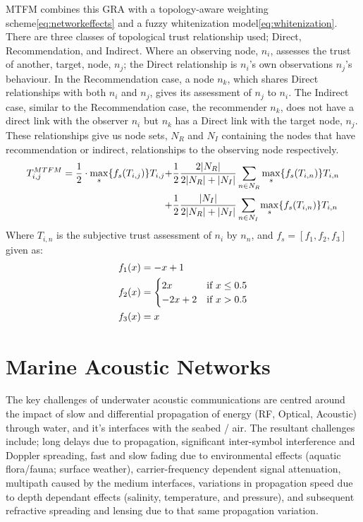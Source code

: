 \documentclass[runningheads,a4paper]{llncs}
\begin{document}
MTFM combines this GRA with a topology-aware weighting scheme\eqref{eq:networkeffects} and a fuzzy whitenization model\eqref{eq:whitenization}. There are three classes of topological trust relationship used; Direct, Recommendation, and Indirect.
Where an observing node, $n_i$, assesses the trust of another, target, node, $n_j$; the Direct relationship is $n_i$'s own observations $n_j$'s behaviour.
In the Recommendation case, a node $n_k$, which shares Direct relationships with both $n_i$ and $n_j$, gives its assessment of $n_j$ to $n_i$.
The Indirect case, similar to the Recommendation case, the recommender $n_k$, does not have a direct link with the observer $n_i$ but $n_k$ has a Direct link with the target node, $n_j$.
These relationships give us node sets, $N_R$ and $N_I$ containing the nodes that have recommendation or indirect, relationships to the observing node respectively.
%
\begin{align}
  \label{eq:networkeffects}
  T_{i,j}^{MTFM}=\frac{1}{2} \cdot \max_s\{f_s(T_{i,j})\} T_{i,j}+&\frac{1}{2} \frac{2|N_R| }{2|N_R| + |N_I|}\sum_{n \in N_R} \max_s\{f_s(T_{i,n})\} T_{i,n}\\ \notag
  +&\frac{1}{2} \frac{|N_I| }{2|N_R| + |N_I|}\sum_{n \in N_I} \max_s\{f_s(T_{i,n})\} T_{i,n} 
\end{align}
 Where $T_{i,n}$ is the subjective trust assessment of $n_i$ by $n_n$, and $f_s = [ f_1,f_2, f_3]$ given as:
\begin{align}
  \label{eq:whitenization}
  f_1(x)&= -x+1\notag\\
  f_2(x)&= 
  \begin{cases}
    2x & \text{if }x\leq 0.5\\
    -2x+2 & \text{if }x>0.5
  \end{cases}\\
  f_3(x)&= x\notag
\end{align}
%
\section{Marine Acoustic Networks}\label{sec:marineacousticnetworks}

The key challenges of underwater acoustic communications are centred around the impact of slow and differential propagation of energy (RF, Optical, Acoustic) through water, and it's interfaces with the seabed / air.
The resultant challenges include; long delays due to propagation, significant inter-symbol interference and Doppler spreading, fast and slow fading due to environmental effects (aquatic flora/fauna; surface weather), carrier-frequency dependent signal attenuation, multipath caused by the medium interfaces, variations in propagation speed due to depth dependant effects (salinity, temperature, and pressure), and subsequent refractive spreading and lensing due to that same propagation variation\cite{Partan2006}.
\end{document}
